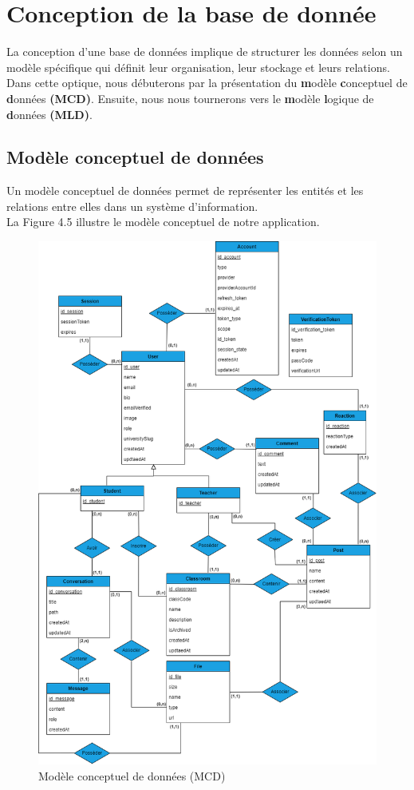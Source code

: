 \section{Conception de la base de donnée}
\justifying
La conception d'une base de données implique de structurer les données selon un modèle spécifique qui définit leur organisation, leur stockage et leurs relations. Dans cette optique, nous débuterons par la présentation du \textbf{m}odèle \textbf{c}onceptuel de \textbf{d}onnées \textbf{(MCD)}. Ensuite, nous nous tournerons vers le \textbf{m}odèle \textbf{l}ogique de \textbf{d}onnées \textbf{(MLD)}.

\subsection{Modèle conceptuel de données}
Un modèle conceptuel de données permet de représenter les entités et les relations entre elles dans un système d’information.\\
La Figure 4.5 illustre le modèle conceptuel de notre application.
\begin{figure}[H]
    \centering
    \includegraphics[width=1.1\textwidth,height=1.4\textwidth]{images/chp4/fig5.png}
    \caption{Modèle conceptuel de données (MCD)}
    \label{fig:Modèle conceptuel de données (MCD)}    
\end{figure}


